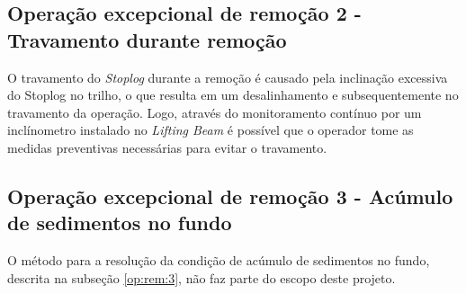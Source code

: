 
\subsection{Operação excepcional de remoção 2 - Travamento durante remoção}

O travamento do \emph{Stoplog} durante a remoção é causado pela inclinação excessiva do Stoplog no trilho, o que resulta em um desalinhamento e subsequentemente no travamento da operação. Logo, através do monitoramento contínuo por um inclínometro instalado no \emph{Lifting Beam} é possível que o operador tome as medidas preventivas necessárias para evitar o travamento.   


\subsection{Operação excepcional de remoção 3 - Acúmulo de sedimentos no fundo}
O método para a resolução da condição de acúmulo de sedimentos no fundo,
descrita na subseção \ref{op:rem:3}, não faz parte do escopo deste projeto.
